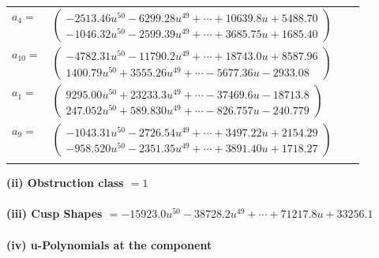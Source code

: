 \documentclass[1p]{elsarticle_modified}
\theoremstyle{definition}
\begin{document}
\begin{tabular}{m{7pt} m{180pt} m{7pt} m{180pt} }
\flushright $a_{4}=$&$\begin{pmatrix}-2513.46 u^{50}-6299.28 u^{49}+\cdots+10639.8 u+5488.70\\-1046.32 u^{50}-2599.39 u^{49}+\cdots+3685.75 u+1685.40\end{pmatrix}$ \\
\flushright $a_{10}=$&$\begin{pmatrix}-4782.31 u^{50}-11790.2 u^{49}+\cdots+18743.0 u+8587.96\\1400.79 u^{50}+3555.26 u^{49}+\cdots-5677.36 u-2933.08\end{pmatrix}$ \\
\flushright $a_{1}=$&$\begin{pmatrix}9295.00 u^{50}+23233.3 u^{49}+\cdots-37469.6 u-18713.8\\247.052 u^{50}+589.830 u^{49}+\cdots-826.757 u-240.779\end{pmatrix}$ \\
\flushright $a_{9}=$&$\begin{pmatrix}-1043.31 u^{50}-2726.54 u^{49}+\cdots+3497.22 u+2154.29\\-958.520 u^{50}-2351.35 u^{49}+\cdots+3891.40 u+1718.27\end{pmatrix}$\\&\end{tabular}
\flushleft \textbf{(ii) Obstruction class $= 1$}\\~\\
\flushleft \textbf{(iii) Cusp Shapes $= -15923.0 u^{50}-38728.2 u^{49}+\cdots+71217.8 u+33256.1$}\\~\\
\newpage\renewcommand{\arraystretch}{1}
\flushleft \textbf{(iv) u-Polynomials at the component}\newline \\
\end{document}
